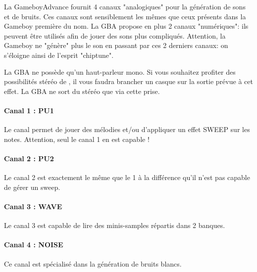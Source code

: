 La GameboyAdvance fournit 4 canaux "analogiques" pour la génération de sons et de bruits.
Ces canaux sont sensiblement les mêmes que ceux présents dans la Gameboy première du nom.
La GBA propose en plus 2 canaux "numériques": ils peuvent être utilisés afin de jouer des sons plus compliqués.
Attention, la Gameboy ne "génère" plus le son en passant par ces 2 derniers canaux: on s'éloigne ainsi de l'esprit "chiptune".

La GBA ne possède qu'un haut-parleur mono.
Si vous souhaitez profiter des possibilités stéréo de \FAT, il vous faudra brancher un casque sur la sortie prévue à cet effet.
La GBA ne sort du stéréo que via cette prise.

\paragraph{Canal 1 : PU1} Le canal permet de jouer des mélodies et/ou d'appliquer un effet SWEEP sur les notes. Attention, seul le canal 1 en est capable !


\paragraph{Canal 2 : PU2} Le canal 2 est exactement le même que le 1 à la différence qu'il n'est pas capable de gérer un sweep.


\paragraph{Canal 3 : WAVE} Le canal 3 est capable de lire des minis-samples répartis dans 2 banques.


\paragraph{Canal 4 : NOISE} Ce canal est spécialisé dans la génération de bruits blancs.


